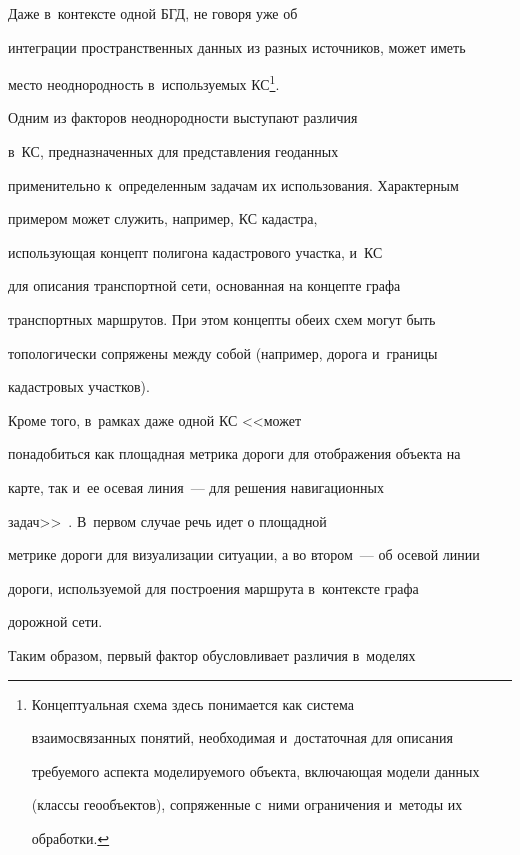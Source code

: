   Даже в~контексте одной БГД, не говоря уже об 


интеграции пространственных данных из разных источников, может иметь 


место неоднородность в~ис\-поль\-зу\-емых КС\footnote{Концептуальная схема здесь понимается как система 


взаимосвязанных понятий, необходимая и~достаточная для описания 


требуемого аспекта моделируемого объекта, включающая модели данных 


(классы геообъектов), сопряженные с~ними ограничения и~методы их 


обработки.}.


  


  Одним из факторов неоднородности выступают различия 


в~КС, предназначенных для представления геоданных 


применительно к~определенным задачам их использования. Характерным 


примером может служить, например, КС кадастра, 


использующая концепт полигона кадастрового участка, и~КС


 для описания транспортной сети, основанная на концепте графа 


транспортных маршрутов. При этом концепты обеих схем могут быть 


топологически сопряжены между собой (например, дорога и~границы 


кадастровых участков).


  


  Кроме того, в~рамках даже одной КС <<может 


понадобиться как площадная метрика дороги для отображения объекта на 


карте, так и~ее осевая линия~--- для решения навигационных 


 задач>>~\cite [с.~48]{9-nik}. В~первом случае речь идет о площадной 


метрике дороги для визуализации ситуации, а во втором~--- об осевой линии 


дороги, используемой для построения маршрута в~контексте графа 


дорожной сети. 


  


  Таким образом, первый фактор обусловливает различия в~моделях 



